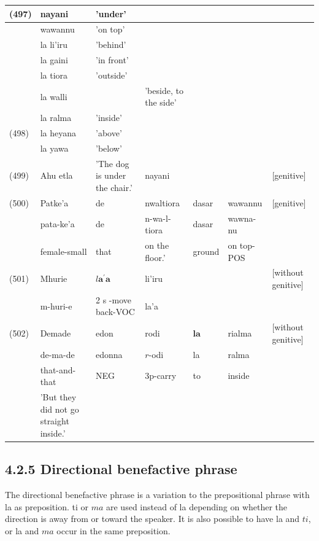 \documentclass[10pt]{article}
\begin{document}
\begin{center}
\begin{tabular}{|l|l|l|l|l|l|l|}
\hline
(497) & nayani & 'under' &  &  &  &  \\
\hline
 & wawannu & 'on top' &  &  &  &  \\
\hline
 & la li'iru & 'behind' &  &  &  &  \\
\hline
 & la gaini & 'in front' &  &  &  &  \\
\hline
 & la tiora & 'outside' &  &  &  &  \\
\hline
 & la walli &  & 'beside, to the side' &  &  &  \\
\hline
 & la ralma & 'inside' &  &  &  &  \\
\hline
(498) & la heyana & 'above' &  &  &  &  \\
\hline
 & la yawa & 'below' &  &  &  &  \\
\hline
(499) & Ahu etla & 'The dog is under the chair.' & nayani &  &  & [genitive] \\
\hline
(500) & Patke'a & de & nwaltiora & dasar & wawannu & [genitive] \\
\hline
 & pata-ke'a & de & n-wa-l-tiora & dasar & wawna-nu &  \\
\hline
 & female-small & that & on the floor.' & ground & on top-POS &  \\
\hline
(501) & Mhurie & \(l \boldsymbol{a}^{\boldsymbol{\prime}} \boldsymbol{a}\) & li'iru &  &  & [without genitive] \\
\hline
 & m-huri-e & 2 s -move back-VOC & la'a &  &  &  \\
\hline
(502) & Demade & edon & rodi & \(\boldsymbol{l} \boldsymbol{a}\) & rialma & [without genitive] \\
\hline
 & de-ma-de & edonna & \(r\)-odi & la & ralma &  \\
\hline
 & that-and-that & NEG & 3p-carry & to & inside &  \\
\hline
 & 'But they did not go straight inside.' &  &  &  &  &  \\
\hline
\end{tabular}
\end{center}

\subsection*{4.2.5 Directional benefactive phrase}
The directional benefactive phrase is a variation to the prepositional phrase with la as preposition. ti or \(m a\) are used instead of la depending on whether the direction is away from or toward the speaker. It is also possible to have la and \(t i\), or la and \(m a\) occur in the same preposition.
\end{document}
